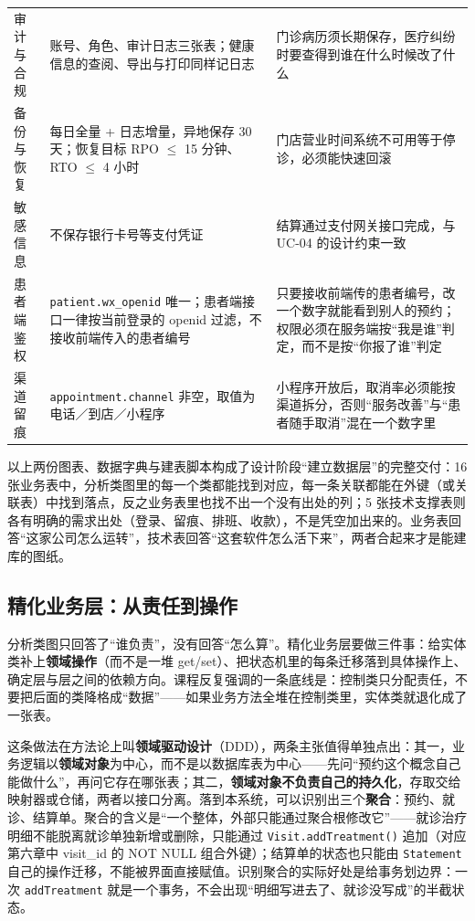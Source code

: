 \documentclass[11pt,a4paper]{ctexart}
\begin{document}
{\begin{longtable}{@{}L{3.7cm}L{6.3cm}L{5.3cm}@{}}
审计与合规 & 账号、角色、审计日志三张表；健康信息的查阅、导出与打印同样记日志 & 门诊病历须长期保存，医疗纠纷时要查得到谁在什么时候改了什么 \\
备份与恢复 & 每日全量 + 日志增量，异地保存 30 天；恢复目标 RPO $\le$ 15 分钟、RTO $\le$ 4 小时 & 门店营业时间系统不可用等于停诊，必须能快速回滚 \\
敏感信息 & 不保存银行卡号等支付凭证 & 结算通过支付网关接口完成，与 UC-04 的设计约束一致 \\
患者端鉴权 & \texttt{patient.wx\_openid} 唯一；患者端接口一律按当前登录的 openid 过滤，不接收前端传入的患者编号 & 只要接收前端传的患者编号，改一个数字就能看到别人的预约；权限必须在服务端按“我是谁”判定，而不是按“你报了谁”判定 \\
渠道留痕 & \texttt{appointment.channel} 非空，取值为电话／到店／小程序 & 小程序开放后，取消率必须能按渠道拆分，否则“服务改善”与“患者随手取消”混在一个数字里 \\
\end{longtable}
}

以上两份图表、数据字典与建表脚本构成了设计阶段“建立数据层”的完整交付：16 张业务表中，分析类图里的每一个类都能找到对应，每一条关联都能在外键（或关联表）中找到落点，反之业务表里也找不出一个没有出处的列；5 张技术支撑表则各有明确的需求出处（登录、留痕、排班、收款），不是凭空加出来的。业务表回答“这家公司怎么运转”，技术表回答“这套软件怎么活下来”，两者合起来才是能建库的图纸。


\subsection{精化业务层：从责任到操作}

分析类图只回答了“谁负责”，没有回答“怎么算”。精化业务层要做三件事：给实体类补上\textbf{领域操作}（而不是一堆 get/set）、把状态机里的每条迁移落到具体操作上、确定层与层之间的依赖方向。课程反复强调的一条底线是：控制类只分配责任，不要把后面的类降格成“数据”——如果业务方法全堆在控制类里，实体类就退化成了一张表。

这条做法在方法论上叫\textbf{领域驱动设计}（DDD），两条主张值得单独点出：其一，业务逻辑以\textbf{领域对象}为中心，而不是以数据库表为中心——先问“预约这个概念自己能做什么”，再问它存在哪张表；其二，\textbf{领域对象不负责自己的持久化}，存取交给映射器或仓储，两者以接口分离。落到本系统，可以识别出三个\textbf{聚合}：预约、就诊、结算单。聚合的含义是“一个整体，外部只能通过聚合根修改它”——就诊治疗明细不能脱离就诊单独新增或删除，只能通过 \texttt{Visit.addTreatment()} 追加（对应第六章中 visit\_id 的 NOT NULL 组合外键）；结算单的状态也只能由 \texttt{Statement} 自己的操作迁移，不能被界面直接赋值。识别聚合的实际好处是给事务划边界：一次 \texttt{addTreatment} 就是一个事务，不会出现“明细写进去了、就诊没写成”的半截状态。
\end{document}
